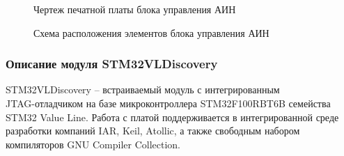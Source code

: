         \begin{figure}[h!]
            \caption{Чертеж печатной платы блока управления АИН}
            \label{fig:control-board-route}
        \end{figure}

        \begin{figure}[h!]
            \caption{Схема расположения элементов блока управления АИН}
            \label{fig:control-board-place}
        \end{figure}

        \clearpage
        
    \subsubsection{Описание модуля STM32VLDiscovery}
        STM32VLDiscovery -- встраиваемый модуль с интегрированным\\
        JTAG-отладчиком на базе микроконтроллера STM32F100RBT6B семейства STM32
        Value Line. Работа с платой поддерживается в интегрированной среде
        разработки компаний IAR, Keil, Atollic, а также свободным набором
        компиляторов GNU Compiler Collection.

